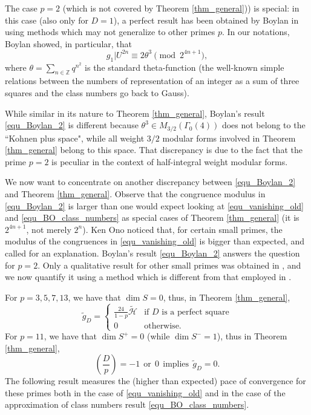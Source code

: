 \documentclass[11pt,letterpaper]{amsart}
\newcommand{\Z}{{\mathbb Z}}
\newcommand{\cH}{{\mathcal H}}
\theoremstyle{remark}
\begin{document}


The case $p=2$ (which is not covered by Theorem \ref{thm_general})) is special: in this case (also only for $D=1$), a perfect result has been obtained by Boylan in \cite{Boylan} using methods which may not generalize to other primes $p$. 
In our notations, Boylan showed, in particular,  that
\begin{equation} \label{equ_Boylan_2}
g_1|U^{2n}\equiv 2\theta^3 \pmod {2^{4n+1}},
\end{equation}
where $\theta = \sum_{n \in \Z} q^{n^2}$ is the standard theta-function (the well-known simple relations between the numbers of representation of an integer as a sum of three squares and the class numbers go back to Gauss). 

While similar in its nature to Theorem \ref{thm_general}, Boylan's result  \eqref{equ_Boylan_2} is different because $\theta^3 \in M_{3/2}(\Gamma_0(4))$ does not belong to the ``Kohnen plus space", while all weight $3/2$ modular forms involved in Theorem \ref{thm_general} belong to this space. That discrepancy is due to the fact that the prime $p=2$ is peculiar in the context of half-integral weight modular forms. 

We now want to concentrate on another discrepancy between \eqref{equ_Boylan_2} and Theorem \ref{thm_general}. 
Observe that the congruence modulus in  \eqref{equ_Boylan_2} is larger than one would expect looking at \eqref{equ_vanishing_old} and \eqref{equ_BO_class_numbers} as special cases of Theorem \ref{thm_general} (it is $2^{4n+1}$, not merely $2^n$). 
Ken Ono \cite[Example 7.15]{Ono_book} noticed that, for certain small primes, the modulus of the congruences in \eqref{equ_vanishing_old} is bigger than expected, and called for an explanation. Boylan's result  \eqref{equ_Boylan_2} answers the question for $p=2$. Only a qualitative result for other small primes was obtained in \cite[Theorem 2]{Gue730}, and we now quantify it using a  method which is different from that employed in \cite{Gue730}. 


For $p=3,5,7,13$, we have that  $\dim S=0$, thus, in Theorem \ref{thm_general}, 
\[
\tilde{g}_D = \begin{cases} \frac{24}{1-p} \tilde{\cH}& \text{if $D$ is a perfect square} \\ 0 & \text{otherwise.} \end{cases}
\]
For $p=11$, we have that $\dim S^+ = 0$ (while $\dim S^- =1$), thus  in Theorem \ref{thm_general}, 
\[
\left(\frac{D}{p} \right) = -1 ~~ \text{or} ~~ 0 ~~ \text{implies} ~~ \tilde{g}_D=0. 
\]
The following result measures the (higher than expected) pace of convergence for these primes both in the case of \eqref{equ_vanishing_old} and in the case of the approximation of class numbers result \eqref{equ_BO_class_numbers}.
\end{document}
